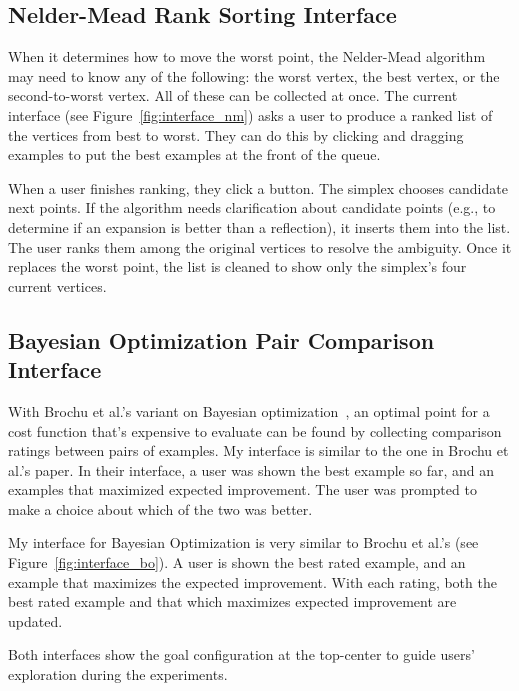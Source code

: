 \subsection{Nelder-Mead Rank Sorting Interface}

When it determines how to move the worst point, the Nelder-Mead algorithm may need to know any of the following:
the worst vertex, the best vertex, or the second-to-worst vertex.
All of these can be collected at once.
The current interface (see Figure~\ref{fig:interface_nm}) asks a user to produce a ranked list of the vertices from best to worst.
They can do this by clicking and dragging examples to put the best examples at the front of the queue.

When a user finishes ranking, they click a button.
The simplex chooses candidate next points.
If the algorithm needs clarification about candidate points (e.g., to determine if an expansion is better than a reflection), it inserts them into the list.
The user ranks them among the original vertices to resolve the ambiguity.
Once it replaces the worst point, the list is cleaned to show only the simplex's four current vertices.

\subsection{Bayesian Optimization Pair Comparison Interface}

With Brochu et al.'s variant on Bayesian optimization~\cite{brochu_tutorial_2010}, an optimal point for a cost function that's expensive to evaluate can be found by collecting comparison ratings between pairs of examples.
My interface is similar to the one in Brochu et al.'s paper.
In their interface, a user was shown the best example so far, and an examples that maximized expected improvement.
The user was prompted to make a choice about which of the two was better.

My interface for Bayesian Optimization is very similar to Brochu et al.'s (see Figure~\ref{fig:interface_bo}).
A user is shown the best rated example, and an example that maximizes the expected improvement.
With each rating, both the best rated example and that which maximizes expected improvement are updated.

Both interfaces show the goal configuration at the top-center to guide users' exploration during the experiments.
